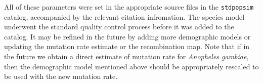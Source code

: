 \documentclass[hidelinks]{article}
\newcommand{\stdpopsim}{\texttt{stdpopsim}\xspace}
\begin{document}
All of these parameters were set in the appropriate source files in the \stdpopsim catalog,
accompanied by the relevant citation infromation.
The species model underwent the standard quality control process before it was added to the catalog.
It may be refined in the future by adding more demographic models or updating the mutation rate estimate
or the recombination map. Note that if in the future we obtain a direct estimate of mutation rate for
\emph{Anopheles gambiae}, then the demographic model mentioned above should be appropriately rescaled to be
used with the new mutation rate.



%
%
%
%
\end{document}
